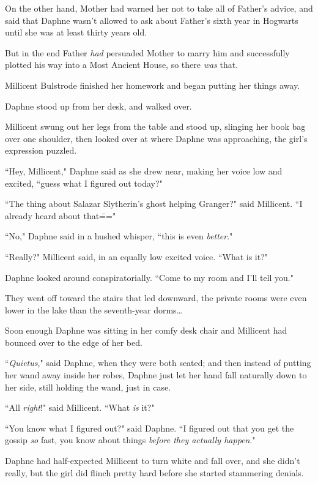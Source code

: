 On the other hand, Mother had warned her not to take all of Father's advice, and said that Daphne wasn't allowed to ask about Father's sixth year in Hogwarts until she was at least thirty years old.

But in the end Father \emph{had} persuaded Mother to marry him and successfully plotted his way into a Most Ancient House, so there \emph{was} that.

Millicent Bulstrode finished her homework and began putting her things away.

Daphne stood up from her desk, and walked over.

Millicent swung out her legs from the table and stood up, slinging her book bag over one shoulder, then looked over at where Daphne was approaching, the girl's expression puzzled.

``Hey, Millicent," Daphne said as she drew near, making her voice low and excited, ``guess what I figured out today?"

``The thing about Salazar Slytherin's ghost helping Granger?" said Millicent. ``I already heard about that\==="

``No," Daphne said in a hushed whisper, ``this is even \emph{better}."

``Really?" Millicent said, in an equally low excited voice. ``What is it?"

Daphne looked around conspiratorially. ``Come to my room and I'll tell you."

They went off toward the stairs that led downward, the private rooms were even lower in the lake than the seventh-year dorms{\ldots}

Soon enough Daphne was sitting in her comfy desk chair and Millicent had bounced over to the edge of her bed.

``\emph{Quietus}," said Daphne, when they were both seated; and then instead of putting her wand away inside her robes, Daphne just let her hand fall naturally down to her side, still holding the wand, just in case.

``All \emph{right}!" said Millicent. ``What \emph{is} it?"

``You know what I figured out?" said Daphne. ``I figured out that you get the gossip \emph{so} fast, you know about things \emph{before they actually happen}."

Daphne had half-expected Millicent to turn white and fall over, and she didn't really, but the girl did flinch pretty hard before she started stammering denials.

